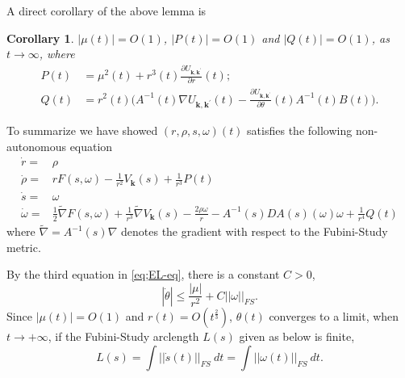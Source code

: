 \documentclass[11pt]{amsart}
\newtheorem{cor}[theorem]{Corollary}
\theoremstyle{definition}
\theoremstyle{remark}
\numberwithin{equation}{section}
\begin{document}
A direct corollary of the above lemma is 
\begin{cor}
\label{cor;mu-P-Q-bound} $|\mu(t)|=O(1)$,  $|P(t)|=O(1)$ and $|Q(t)|=O(1)$, as $t \to \infty$, where
$$
\begin{aligned}
P(t)& =\mu^2(t)+r^3(t)\frac{\partial U_{\mathbf{k},\mathbf{k}^\prime}}{\partial r}(t); \\
Q(t) & =r^2(t)\Big(A^{-1}(t)\nabla U_{\mathbf{k},\mathbf{k}^\prime}(t)-\frac{\partial U_{\mathbf{k},\mathbf{k}^\prime}}{\partial\theta}(t)A^{-1}(t)B(t)\Big).
\end{aligned}
$$ 
\end{cor}
 

  

To summarize we have showed $(r,\rho,s,\omega)(t)$ satisfies the following non-autonomous equation
\begin{equation}
\label{eq;EL-eq2}
\begin{aligned}
    \dot{r}=&\rho\\
    \dot{\rho}=&rF(s,\omega)-\frac{1}{r^2}V_\mathbf{k}(s)+\frac{1}{r^3}P(t)\\
    \dot{s}=&\omega\\
    \dot{\omega}=&\frac{1}{2}\tilde{\nabla} F(s,\omega)+\frac{1}{r^3}\tilde{\nabla} V_{\mathbf{k}}(s)-\frac{2\rho\omega}{r}-A^{-1}(s)DA(s)(\omega)\omega+\frac{1}{r^4}Q(t)
    \end{aligned}
\end{equation}
where $\tilde{\nabla}=A^{-1}(s)\nabla$ denotes the gradient with respect to the Fubini-Study metric.

By the third equation in \eqref{eq;EL-eq}, there is a constant $C>0$,
\begin{equation}
\label{eq;tht-dot} |\dot{\theta}|\le \frac{|\mu|}{r^2}+C||\omega||_{FS}.
\end{equation}
Since $|\mu(t)|=O(1)$ and $r(t)=O(t^{\frac{2}{3}})$, $\theta(t)$ converges to a limit, when $t\rightarrow+\infty$, if the Fubini-Study arclength $L(s)$ given as below is finite,  
\begin{equation}
\label{eq;len-eq}
    L(s)=\int||\dot{s}(t)||_{FS}\ dt=\int||\omega(t)||_{FS}\ dt.
\end{equation}
\end{document}
